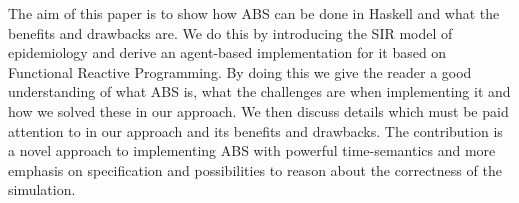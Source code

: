 The aim of this paper is to show how ABS can be done in Haskell and what the benefits and drawbacks are. We do this by introducing the SIR model of epidemiology and derive an agent-based implementation for it based on Functional Reactive Programming. By doing this we give the reader a good understanding of what ABS is, what the challenges are when implementing it and how we solved these in our approach. We then discuss details which must be paid attention to in our approach and its benefits and drawbacks. The contribution is a novel approach to implementing ABS with powerful time-semantics and more emphasis on specification and possibilities to reason about the correctness of the simulation.